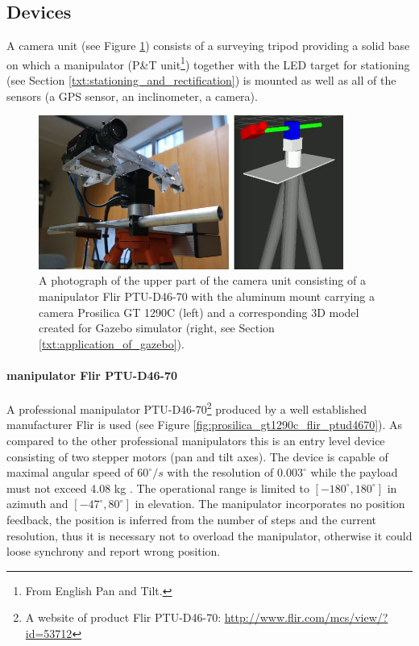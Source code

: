 \subsection{Devices} \label{txt:devices}

A camera unit (see Figure \ref{fig:camera_unit_photo_model}) consists of a surveying tripod providing a solid base on which a manipulator (P\&T unit\footnote{From English Pan and Tilt.}) together with the LED target for stationing (see Section \ref{txt:stationing_and_rectification}) is mounted as well as all of the sensors (a GPS sensor, an inclinometer, a camera).

\begin{figure}[htb]
	\centering
	\includegraphics[width=10cm]{fig/camera_unit_photo_model.jpg}
	\caption{A photograph of the upper part of the camera unit consisting of a manipulator Flir PTU-D46-70 with the aluminum mount carrying a camera Prosilica GT 1290C (left) and a corresponding 3D model created for Gazebo simulator (right, see Section \ref{txt:application_of_gazebo}).}
	\label{fig:camera_unit_photo_model}
\end{figure}

\paragraph{manipulator Flir PTU-D46-70} A professional manipulator PTU-D46-70\footnote{A website of product Flir PTU-D46-70: \url{http://www.flir.com/mcs/view/?id=53712}} produced by a well established manufacturer Flir is used (see Figure \ref{fig:prosilica_gt1290c_flir_ptud4670}). As compared to the other professional manipulators this is an entry level device consisting of two stepper motors (pan and tilt axes). The device is capable of maximal angular speed of $60^{\circ}/s$ with the resolution of $0.003^{\circ}$ while the payload must not exceed 4.08 kg \cite{Flir_ptud4670}. The operational range is limited to $[-180^{\circ}, 180^{\circ}]$ in azimuth and $[-47^{\circ}, 80^{\circ}]$ in elevation. The manipulator incorporates no position feedback, the position is inferred from the number of steps and the current resolution, thus it is necessary not to overload the manipulator, otherwise it could loose synchrony and report wrong position. 

